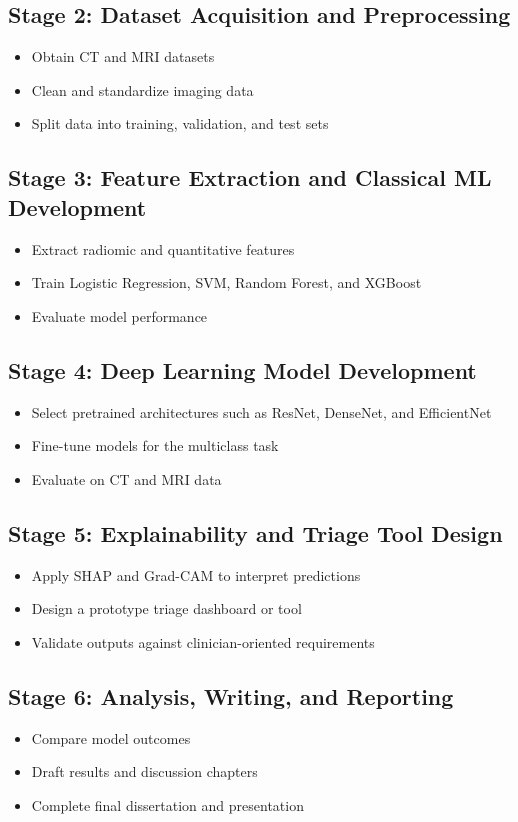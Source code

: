 \documentclass[12pt,a4paper]{report}
\begin{document}
\subsection{Stage 2: Dataset Acquisition and Preprocessing}
\begin{itemize}
\item Obtain CT and MRI datasets
\item Clean and standardize imaging data
\item Split data into training, validation, and test sets
\end{itemize}

\subsection{Stage 3: Feature Extraction and Classical ML Development}
\begin{itemize}
\item Extract radiomic and quantitative features
\item Train Logistic Regression, SVM, Random Forest, and XGBoost
\item Evaluate model performance
\end{itemize}

\subsection{Stage 4: Deep Learning Model Development}
\begin{itemize}
\item Select pretrained architectures such as ResNet, DenseNet, and EfficientNet
\item Fine-tune models for the multiclass task
\item Evaluate on CT and MRI data
\end{itemize}

\subsection{Stage 5: Explainability and Triage Tool Design}
\begin{itemize}
\item Apply SHAP and Grad-CAM to interpret predictions
\item Design a prototype triage dashboard or tool
\item Validate outputs against clinician-oriented requirements
\end{itemize}

\subsection{Stage 6: Analysis, Writing, and Reporting}
\begin{itemize}
\item Compare model outcomes
\item Draft results and discussion chapters
\item Complete final dissertation and presentation
\end{itemize}
\end{document}
